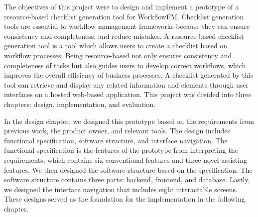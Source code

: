 




The objectives of this project were to design and implement a prototype of a resource-based checklist generation tool for WorkflowFM. Checklist generation tools are essential to workflow management frameworks because they can ensure consistency and completeness, and reduce mistakes. A resource-based checklist generation tool is a tool which allows users to create a checklist based on workflow processes. Being resource-based not only ensures consistency and completeness of tasks but also guides users to develop correct workflows, which improves the overall efficiency of business processes. A checklist generated by this tool can retrieve and display any related information and elements through user interfaces on a hosted web-based application. This project was divided into three chapters: design, implementation, and evaluation.

In the design chapter, we designed this prototype based on the requirements from previous work, the product owner, and relevant tools. The design includes functional specification, software structure, and interface navigation. The functional specification is the features of the prototype from interpreting the requirements, which contains six conventional features and three novel assisting features. We then designed the software structure based on the specification. The software structure contains three parts: backend, frontend, and database. Lastly, we designed the interface navigation that includes eight interactable screens.
These designs served as the foundation for the implementation in the following chapter.

